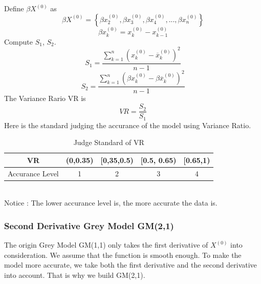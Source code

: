 \documentclass{mcmthesis}
\begin{document}
\begin{itemize}
		Define $\beta X^{(0)}$ as
			$$
				\beta X^{(0)} = \left\{\beta x^{(0)}_2,\beta x^{(0)}_3,\beta x^{(0)}_4,...,\beta x^{(0)}_n \right\}
			$$
			$$
				\beta x^{(0)}_k = x^{(0)}_k - x^{(0)}_{k-1}
			$$
			Compute $S_1$, $S_2$.
			$$
				S_1 = \frac{\sum^n_{k=1}(x^{(0)}_k - \overline x^{(0)}_k)^2}{n-1}
			$$ 
			$$
				S_2 = \frac{\sum^n_{k=1}(\beta x^{(0)}_k - \beta \overline x^{(0)}_k)^2}{n-1}	
			$$
			The Variance Rario VR is 
			$$
				VR = \frac{S_2}{S_1}
			$$
			Here is the standard judging the accurance of the model using Variance Ratio.
			\begin{table}[!h]
  			\centering
  			\begin{tabular}{ccccc}
			\toprule  %
    		VR & (0,0.35) & [0,35,0.5) & [0.5, 0.65) & [0.65,1)\\
			\midrule  %
			Accurance Level & 1 & 2 & 3 & 4\\
			\bottomrule %
			\end{tabular}
			\caption{Judge Standard of VR}
			\end{table}\\
			Notice : The lower accurance level is, the more accurate the data is.
			\end{itemize}

\iffalse
\subsubsection{Second Derivative Grey Model GM(2,1)}
The origin Grey Model GM(1,1) only takes the first derivative of $X^{(0)}$ into consideration. We assume that the function is smooth enough. To make the model more accurate, we take both the first derivative and the second derivative into account. That is why we build GM(2,1).
\end{document}

